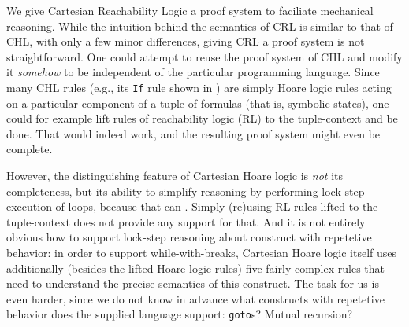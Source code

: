 

We give Cartesian Reachability Logic a proof system to faciliate mechanical reasoning.
While the intuition behind the semantics of CRL is similar to that of CHL, with only a few minor differences,
giving CRL a proof system is not straightforward.
One could attempt to reuse the proof system of CHL and modify it \emph{somehow} to be independent
of the particular programming language.
Since many CHL rules (e.g., its \texttt{If} rule shown in ) are simply Hoare logic rules acting on a particular component of
a tuple of formulas (that is, symbolic states),
one could for example lift rules of reachability logic (RL) to the tuple-context and be done.
That would indeed work, and the resulting proof system might even be complete.

However, the distinguishing feature of Cartesian Hoare logic is \emph{not} its completeness,
but its ability to simplify reasoning by performing lock-step execution of loops,
because that can .
Simply (re)using RL rules lifted to the tuple-context does not provide any support for that.
And it is not entirely obvious how to support lock-step reasoning about construct with repetetive behavior:
in order to support while-with-breaks, Cartesian Hoare logic itself uses additionally (besides the lifted Hoare logic rules)
five fairly complex rules that need to understand the precise semantics of this construct.
The task for us is even harder, since we do not know in advance what constructs with repetetive behavior does
the supplied language support: \texttt{goto}s? Mutual recursion? 

